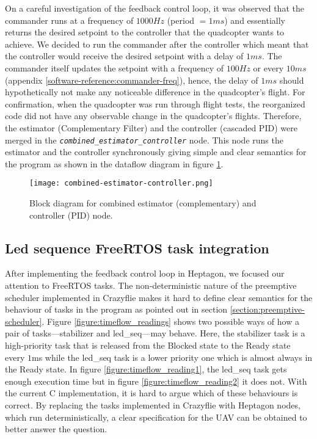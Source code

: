 \documentclass[10pt, a4paper]{article}
\newcommand{\textFunc}[1]{\texttt{\textit{#1}}}
\begin{document}
    On a careful investigation of the feedback control loop, it was observed that the commander runs at a frequency of $1000Hz$ (period $=1ms$) and essentially returns the desired setpoint to the controller that the quadcopter wants to achieve. We decided to run the commander after the controller which meant that the controller would receive the desired setpoint with a delay of $1ms$. The commander itself updates the setpoint with a frequency of $100Hz$ or every $10ms$ (appendix \ref{software-reference:commander-freq}), hence, the delay of $1ms$ should hypothetically not make any noticeable difference in the quadcopter's flight. For confirmation, when the quadcopter was run through flight tests, the reorganized code did not have any observable change in the quadcopter's flights. Therefore, the estimator (Complementary Filter) and the controller (cascaded PID) were merged in the \textFunc{combined\_estimator\_controller} node. This node runs the estimator and the controller synchronously giving simple and clear semantics for the program as shown in the dataflow diagram in figure \ref{figure:combined-estimator-controller}.

    \begin{figure}[hbt!]
        \centering
        \texttt{[image: combined-estimator-controller.png]}
        \caption{Block diagram for combined estimator (complementary) and controller (PID) node.}
        \label{figure:combined-estimator-controller}
    \end{figure}

    \subsection{Led sequence FreeRTOS task integration}
    \label{section:ledseq-task}
    After implementing the feedback control loop in Heptagon, we focused our attention to FreeRTOS tasks. The non-deterministic nature of the preemptive scheduler implemented in Crazyflie makes it hard to define clear semantics for the behaviour of tasks in the program as pointed out in section \ref{section:preemptive-scheduler}. Figure \ref{figure:timeflow_readings} shows two possible ways of how a pair of tasks---stabilizer and led\_seq---may behave. Here, the stabilizer task is a high-priority task that is released from the Blocked state to the Ready state every $1$ms while the led\_seq task is a lower priority one which is almost always in the Ready state. In figure \ref{figure:timeflow_reading1}, the led\_seq task gets enough execution time but in figure \ref{figure:timeflow_reading2} it does not. With the current C implementation, it is hard to argue which of these behaviours is correct. By replacing the tasks implemented in Crazyflie with Heptagon nodes, which run deterministically, a clear specification for the UAV can be obtained to better answer the question.
\end{document}
